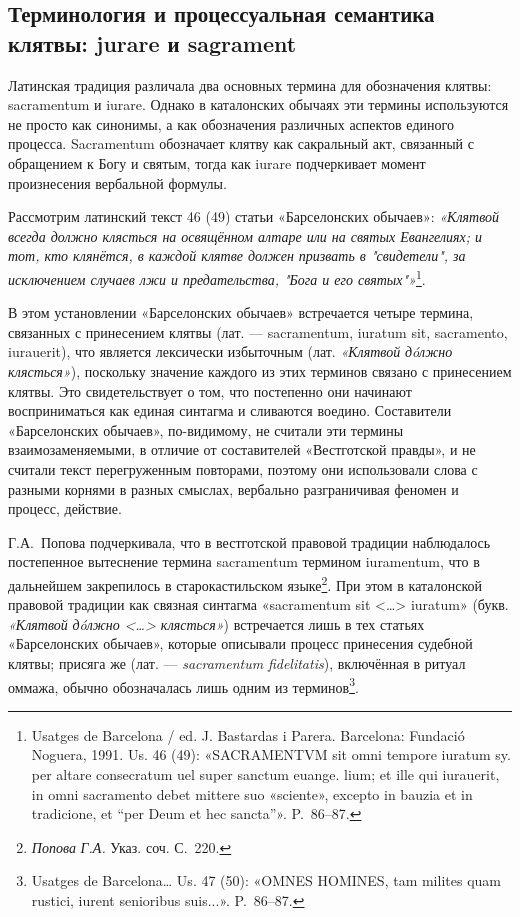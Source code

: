 \subsection{Терминология и процессуальная семантика клятвы: jurare и sagrament}

Латинская традиция различала два основных термина для обозначения клятвы: sacramentum и iurare. Однако в каталонских обычаях эти термины используются не просто как синонимы, а как обозначения различных аспектов единого процесса. Sacramentum обозначает клятву как сакральный акт, связанный с обращением к Богу и святым, тогда как iurare подчеркивает момент произнесения вербальной формулы.

Рассмотрим латинский текст 46 (49) статьи «Барселонских обычаев»: \emph{«Клятвой всегда должно клясться на освящённом алтаре или на святых Евангелиях; и тот, кто клянётся, в каждой клятве должен призвать в "свидетели", за исключением случаев лжи и предательства, "Бога и его святых"»}\footnote{Usatges de Barcelona / ed. J. Bastardas i Parera. Barcelona: Fundació Noguera, 1991. Us. 46 (49): «SACRAMENTVM sit omni tempore iuratum sy. per altare consecratum uel super sanctum euange. lium; et ille qui iurauerit, in omni sacramento debet mittere suo «sciente», excepto in bauzia et in tradicione, et “per Deum et hec sancta”». P.~86--87.}.

В этом установлении «Барселонских обычаев» встречается четыре термина, связанных с принесением клятвы (лат. --- sacramentum, iuratum sit, sacramento, iurauerit), что является лексически избыточным (лат. \emph{«Клятвой }\emph{дóлжно}\emph{ клясться»}), поскольку значение каждого из этих терминов связано с принесением клятвы. Это свидетельствует о том, что постепенно они начинают восприниматься как единая синтагма и сливаются воедино. Составители «Барселонских обычаев», по-видимому, не считали эти термины взаимозаменяемыми, в отличие от составителей «Вестготской правды», и не считали текст перегруженным повторами, поэтому они использовали слова с разными корнями в разных смыслах, вербально разграничивая феномен и процесс, действие.

Г.А.~Попова подчеркивала, что в вестготской правовой традиции наблюдалось постепенное вытеснение термина sacramentum термином iuramentum, что в дальнейшем закрепилось в старокастильском языке\footnote{\emph{Попова}\emph{ }\emph{Г}\emph{.}\emph{А}\emph{. }Указ. соч. С.~220.}. При этом в каталонской правовой традиции как связная синтагма «sacramentum sit <…> iuratum» (букв. \emph{«Клятвой }\emph{дóлжно}\emph{ <…> клясться»}) встречается лишь в тех статьях «Барселонских обычаев», которые описывали процесс принесения судебной клятвы; присяга же (лат. --- \emph{sacramentum}\emph{ }\emph{fidelitatis}), включённая в ритуал оммажа, обычно обозначалась лишь одним из терминов\footnote{Usatges de Barcelona… Us. 47 (50): «OMNES HOMINES, tam milites quam rustici, iurent senioribus suis...». P.~86--87.}.


